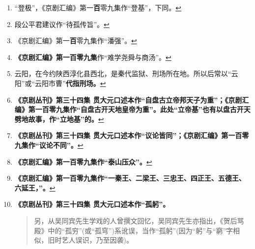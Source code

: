 \begin{enumerate}
\item
  \leavevmode\hypertarget{fn436}{}%
  ``登极''，《京剧汇编》第一\textbf{百}零九集作``登基''，下同。\protect\hyperlink{fnref436}{↩}
\item
  \leavevmode\hypertarget{fn437}{}%
  段公平君建议作``待孤传旨''。\protect\hyperlink{fnref437}{↩}
\item
  \leavevmode\hypertarget{fn438}{}%
  《京剧汇编》第一\textbf{百}零九集作``潘强''。\protect\hyperlink{fnref438}{↩}
\item
  \leavevmode\hypertarget{fn439}{}%
  \textbf{《京剧汇编》第一百零九集}作``难学尧舜与商汤''。\protect\hyperlink{fnref439}{↩}
\item
  \leavevmode\hypertarget{fn440}{}%
  云阳，在今约陕西淳化县西北，是秦代监狱、刑场所在地。所以后常以``云阳''或``云阳市曹''\textbf{代指刑场。}\protect\hyperlink{fnref440}{↩}
\item
  \leavevmode\hypertarget{fn441}{}%
  \textbf{《京剧丛刊》第三十四集
  贯大元口述本作``自盘古立帝邦天子为重''；《京剧汇编》第一百零九集作``自盘古开天地皇帝为重''。此处``立帝基''也有以盘古开天劈地故事，作``立地基''的。}\protect\hyperlink{fnref441}{↩}
\item
  \leavevmode\hypertarget{fn442}{}%
  \textbf{《京剧丛刊》第三十四集
  贯大元口述本作``议论皆同''；《京剧汇编》第一百零九集作``议论不同''。}\protect\hyperlink{fnref442}{↩}
\item
  \leavevmode\hypertarget{fn443}{}%
  \textbf{《京剧汇编》第一百零九集作``泰山压众''。}\protect\hyperlink{fnref443}{↩}
\item
  \leavevmode\hypertarget{fn444}{}%
  \textbf{《京剧汇编》第一百零九集作``一秦王、二梁王、三忠王、四正王、五德王、六延王，''。}\protect\hyperlink{fnref444}{↩}
\item
  \leavevmode\hypertarget{fn445}{}%
  \textbf{《京剧丛刊》第三十四集 贯大元口述本作``孤躬''。}

  \begin{quote}
  另，从吴同宾先生学戏的人曾撰文回忆，吴同宾先生亦指出，《贺后骂殿》中的``孤穷''(或``孤穹'')系讹误，当作``孤躬''(因为``躬''与``窮''字相似，旧时艺人误识，乃至因袭)。
  \end{quote}


\end{enumerate}
